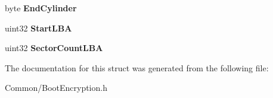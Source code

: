 \begin{DoxyCompactItemize}
byte {\bfseries End\+Cylinder}
\item 
\mbox{\label{struct_gost_crypt_1_1_partition_entry_m_b_r_a4ab8124f220585bc91e5a6faaa1bd286}} 
uint32 {\bfseries Start\+L\+BA}
\item 
\mbox{\label{struct_gost_crypt_1_1_partition_entry_m_b_r_ae8c7e3e2bcf04eaf2e685cfa5ef2e4bb}} 
uint32 {\bfseries Sector\+Count\+L\+BA}
\end{DoxyCompactItemize}


The documentation for this struct was generated from the following file\+:\begin{DoxyCompactItemize}
\item 
Common/Boot\+Encryption.\+h\end{DoxyCompactItemize}

